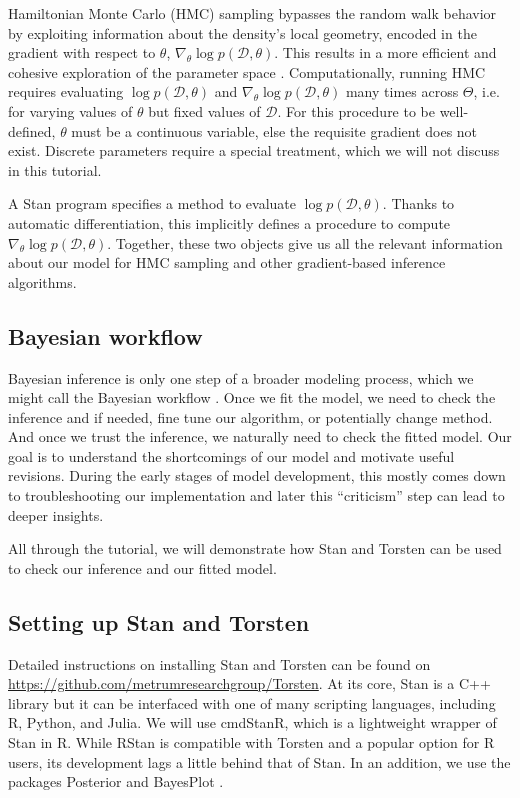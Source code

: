 Hamiltonian Monte Carlo (HMC) sampling bypasses the random walk behavior by exploiting information about the density's local geometry, encoded in the gradient with respect to $\theta$, $\nabla_\theta \log p(\mathcal D, \theta)$.
This results in a more efficient and cohesive exploration of the parameter space \cite{Neil:2012; Hoffman:2014}.
Computationally, running HMC requires evaluating $\log p(\mathcal D, \theta)$ and $\nabla_\theta \log p(\mathcal D, \theta)$ many times across $\Theta$, i.e. for varying values of $\theta$ but fixed values of $\mathcal D$.
For this procedure to be well-defined, $\theta$ must be a continuous variable, else the requisite gradient does not exist.
Discrete parameters require a special treatment, which we will not discuss in this tutorial.

A Stan program specifies a method to evaluate $\log p(\mathcal D, \theta)$.
Thanks to automatic differentiation, this implicitly defines a procedure to compute $\nabla_\theta \log p(\mathcal D, \theta)$.
Together, these two objects give us all the relevant information about our model for HMC sampling and other gradient-based inference algorithms.

\subsection{Bayesian workflow}

Bayesian inference is only one step of a broader modeling process, which we might call the Bayesian workflow \cite{Betancourt:2018, Gelman:2020}.
Once we fit the model, we need to check the inference and if needed, fine tune our algorithm, or potentially change method.
And once we trust the inference, we naturally need to check the fitted model.
Our goal is to understand the shortcomings of our model and motivate useful revisions.
During the early stages of model development, this mostly comes down to troubleshooting our implementation and later this ``criticism'' step can lead to deeper insights.

All through the tutorial, we will demonstrate how Stan and Torsten can be used to check our inference and our fitted model.

\subsection{Setting up Stan and Torsten}

Detailed instructions on installing Stan and Torsten can be found on \url{https://github.com/metrumresearchgroup/Torsten}.
At its core, Stan is a C++ library but it can be interfaced with one of many scripting languages, including R, Python, and Julia.
We will use cmdStanR, which is a lightweight wrapper of Stan in R.
While RStan is compatible with Torsten and a popular option for R users, its development lags a little behind that of Stan.
In an addition, we use the packages Posterior \cite{author:0000} and BayesPlot \cite{author:0000}.

